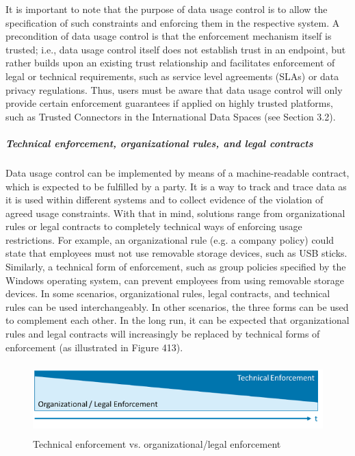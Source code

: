 It is important to note that the purpose of data usage control is to allow the specification of such constraints and enforcing them in the respective system. A precondition of data usage control is that the enforcement mechanism itself is trusted; i.e., data usage control itself does not establish trust in an endpoint, but rather builds upon an existing trust relationship and facilitates enforcement of legal or technical requirements, such as service level agreements (SLAs) or data privacy regulations. Thus, users must be aware that data usage control will only provide certain enforcement guarantees if applied on highly trusted platforms, such as Trusted Connectors in the International Data Spaces (see Section 3.2).


\subparagraph*{Technical enforcement, organizational rules, and legal contracts\\}
Data usage control can be implemented by means of a machine-readable contract, which is expected to be fulfilled by a party. It is a way to track and trace data as it is used within different systems and to collect evidence of the violation of agreed usage constraints. With that in mind, solutions range from organizational rules or legal contracts to completely technical ways of enforcing usage restrictions. For example, an organizational rule (e.g. a company policy) could state that employees must not use removable storage devices, such as USB sticks. Similarly, a technical form of enforcement, such as group policies specified by the Windows operating system, can prevent employees from using removable storage devices. In some scenarios, organizational rules, legal contracts, and technical rules can be used interchangeably. In other scenarios, the three forms can be used to complement each other. In the long run, it can be expected that organizational rules and legal contracts will increasingly be replaced by technical forms of enforcement (as illustrated in Figure 413).




\begin{figure}[H]
	\begin{Center}
		\includegraphics[width=5.33in,height=1.08in]{./media/image69.png}
		\caption{ Technical enforcement vs. organizational/legal enforcement}
		\label{fig:_Technical_enforcement_vs_organizationallegal_enforcement}
	\end{Center}
\end{figure}


